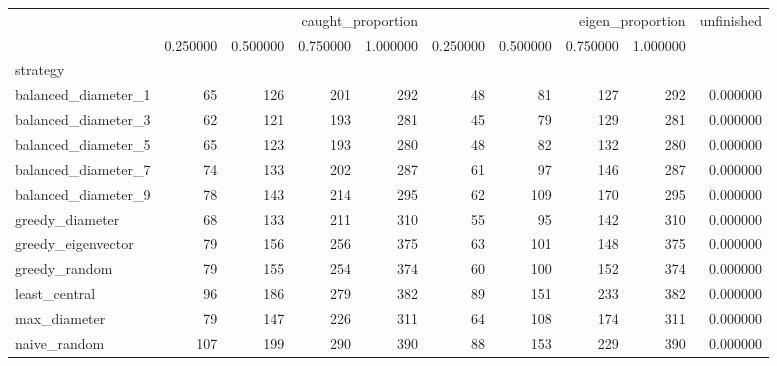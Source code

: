 \begin{tabular}{lrrrrrrrrr}
 & \multicolumn{4}{r}{caught_proportion} & \multicolumn{4}{r}{eigen_proportion} & unfinished \\
 & 0.250000 & 0.500000 & 0.750000 & 1.000000 & 0.250000 & 0.500000 & 0.750000 & 1.000000 &  \\
strategy &  &  &  &  &  &  &  &  &  \\
balanced_diameter_1 & 65 & 126 & 201 & 292 & 48 & 81 & 127 & 292 & 0.000000 \\
balanced_diameter_3 & 62 & 121 & 193 & 281 & 45 & 79 & 129 & 281 & 0.000000 \\
balanced_diameter_5 & 65 & 123 & 193 & 280 & 48 & 82 & 132 & 280 & 0.000000 \\
balanced_diameter_7 & 74 & 133 & 202 & 287 & 61 & 97 & 146 & 287 & 0.000000 \\
balanced_diameter_9 & 78 & 143 & 214 & 295 & 62 & 109 & 170 & 295 & 0.000000 \\
greedy_diameter & 68 & 133 & 211 & 310 & 55 & 95 & 142 & 310 & 0.000000 \\
greedy_eigenvector & 79 & 156 & 256 & 375 & 63 & 101 & 148 & 375 & 0.000000 \\
greedy_random & 79 & 155 & 254 & 374 & 60 & 100 & 152 & 374 & 0.000000 \\
least_central & 96 & 186 & 279 & 382 & 89 & 151 & 233 & 382 & 0.000000 \\
max_diameter & 79 & 147 & 226 & 311 & 64 & 108 & 174 & 311 & 0.000000 \\
naive_random & 107 & 199 & 290 & 390 & 88 & 153 & 229 & 390 & 0.000000 \\
\end{tabular}
